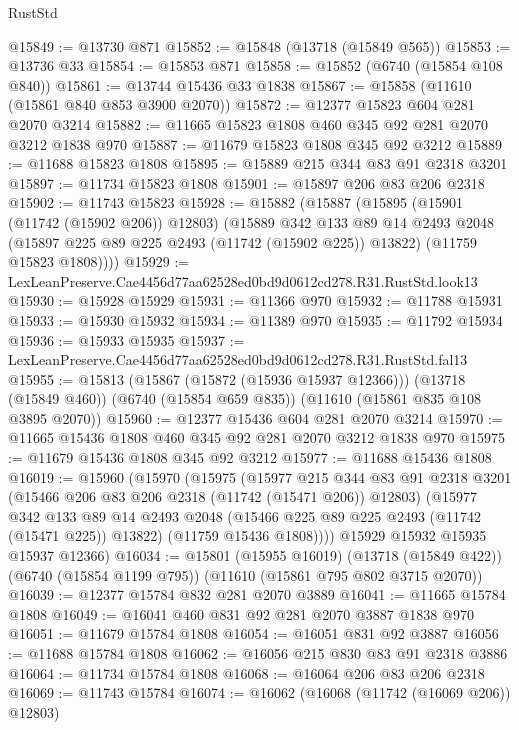 \begin{lexlean}{RustStd}
\begin{coremodule}
@15849 := @13730 @871
@15852 := @15848 (@13718 (@15849 @565))
@15853 := @13736 @33
@15854 := @15853 @871
@15858 := @15852 (@6740 (@15854 @108 @840))
@15861 := @13744 @15436 @33 @1838
@15867 := @15858 (@11610 (@15861 @840 @853 @3900 @2070))
@15872 := @12377 @15823 @604 @281 @2070 @3214
@15882 := @11665 @15823 @1808 @460 @345 @92 @281 @2070 @3212 @1838 @970
@15887 := @11679 @15823 @1808 @345 @92 @3212
@15889 := @11688 @15823 @1808
@15895 := @15889 @215 @344 @83 @91 @2318 @3201
@15897 := @11734 @15823 @1808
@15901 := @15897 @206 @83 @206 @2318
@15902 := @11743 @15823
@15928 := @15882
    (@15887
      (@15895
        (@15901 (@11742 (@15902 @206)) @12803)
        (@15889
          @342
          @133
          @89
          @14
          @2493
          @2048
          (@15897 @225 @89 @225 @2493 (@11742 (@15902 @225)) @13822)
          (@11759 @15823 @1808))))
@15929 := LexLeanPreserve.Cae4456d77aa62528ed0bd9d0612cd278.R31.RustStd.look13
@15930 := @15928 @15929
@15931 := @11366 @970
@15932 := @11788 @15931
@15933 := @15930 @15932
@15934 := @11389 @970
@15935 := @11792 @15934
@15936 := @15933 @15935
@15937 := LexLeanPreserve.Cae4456d77aa62528ed0bd9d0612cd278.R31.RustStd.fal13
@15955 := @15813
    (@15867 (@15872 (@15936 @15937 @12366)))
    (@13718 (@15849 @460))
    (@6740 (@15854 @659 @835))
    (@11610 (@15861 @835 @108 @3895 @2070))
@15960 := @12377 @15436 @604 @281 @2070 @3214
@15970 := @11665 @15436 @1808 @460 @345 @92 @281 @2070 @3212 @1838 @970
@15975 := @11679 @15436 @1808 @345 @92 @3212
@15977 := @11688 @15436 @1808
@16019 := @15960
    (@15970
      (@15975
        (@15977
          @215
          @344
          @83
          @91
          @2318
          @3201
          (@15466 @206 @83 @206 @2318 (@11742 (@15471 @206)) @12803)
          (@15977
            @342
            @133
            @89
            @14
            @2493
            @2048
            (@15466 @225 @89 @225 @2493 (@11742 (@15471 @225)) @13822)
            (@11759 @15436 @1808))))
      @15929
      @15932
      @15935
      @15937
      @12366)
@16034 := @15801
    (@15955 @16019)
    (@13718 (@15849 @422))
    (@6740 (@15854 @1199 @795))
    (@11610 (@15861 @795 @802 @3715 @2070))
@16039 := @12377 @15784 @832 @281 @2070 @3889
@16041 := @11665 @15784 @1808
@16049 := @16041 @460 @831 @92 @281 @2070 @3887 @1838 @970
@16051 := @11679 @15784 @1808
@16054 := @16051 @831 @92 @3887
@16056 := @11688 @15784 @1808
@16062 := @16056 @215 @830 @83 @91 @2318 @3886
@16064 := @11734 @15784 @1808
@16068 := @16064 @206 @83 @206 @2318
@16069 := @11743 @15784
@16074 := @16062 (@16068 (@11742 (@16069 @206)) @12803)

\end{coremodule}
\end{lexlean}
